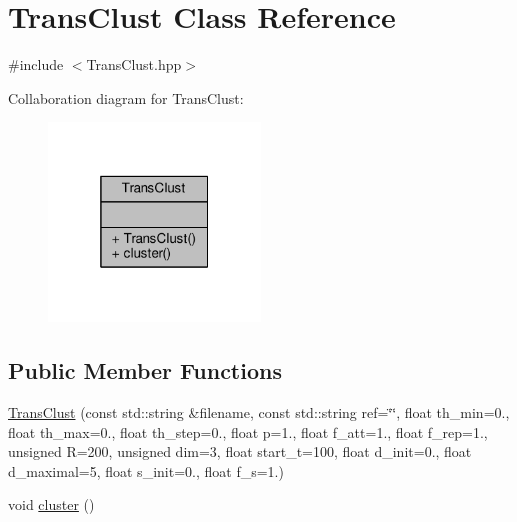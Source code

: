 \hypertarget{classTransClust}{\section{Trans\-Clust Class Reference}
\label{classTransClust}
}


{\ttfamily \#include $<$Trans\-Clust.\-hpp$>$}



Collaboration diagram for Trans\-Clust\-:\nopagebreak
\begin{figure}[H]
\begin{center}
\leavevmode
\includegraphics[width=160pt]{classTransClust__coll__graph}
\end{center}
\end{figure}
\subsection*{Public Member Functions}
\begin{DoxyCompactItemize}
\item 
\hyperlink{classTransClust_ad3b9cd0d16716606a44d0deae0c65400}{Trans\-Clust} (const std\-::string \&filename, const std\-::string ref=\char`\"{}\char`\"{}, float th\-\_\-min=0., float th\-\_\-max=0., float th\-\_\-step=0., float p=1., float f\-\_\-att=1., float f\-\_\-rep=1., unsigned R=200, unsigned dim=3, float start\-\_\-t=100, float d\-\_\-init=0., float d\-\_\-maximal=5, float s\-\_\-init=0., float f\-\_\-s=1.)
\item 
void \hyperlink{classTransClust_a2a54c074c97d910e18dac65507c86cbe}{cluster} ()
\end{DoxyCompactItemize}


